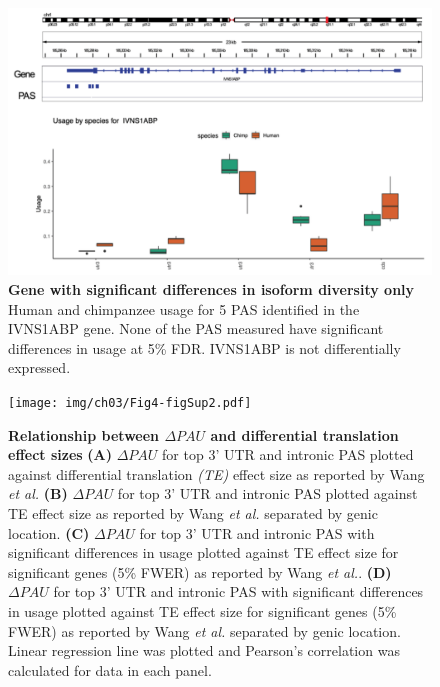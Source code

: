 \begin{figure}[!htb]
\centering
\includegraphics[width=5in]{img/ch03/Fig4_figSup1.pdf}
\caption[Gene with significant differences in isoform diversity only]{\textbf{Gene with significant differences in isoform diversity only} Human and chimpanzee usage for 5 PAS identified in the IVNS1ABP gene. None of the PAS measured have significant differences in usage at 5\% FDR. IVNS1ABP is not differentially expressed.}
\label{fig:ch03-ivn}
\end{figure}
\clearpage

\begin{figure}[!htb]
\centering
\texttt{[image: img/ch03/Fig4-figSup2.pdf]}
\caption[Relationship between $\Delta PAU$  and differential translation effect sizes]{\textbf{Relationship between $\Delta PAU$  and differential translation effect sizes} {\bf (A)} $\Delta PAU$ for top 3' UTR and intronic PAS plotted against differential translation \emph{(TE)} effect size as reported by Wang \emph{et al.}\citep{wang_post-translational_2018} {\bf (B)} $\Delta PAU$ for top 3' UTR and intronic PAS plotted against TE effect size as reported by Wang \emph{et al.} \citep{wang_post-translational_2018} separated by genic location.  {\bf (C)} $\Delta PAU$ for top 3' UTR and intronic PAS with significant differences in usage plotted against TE effect size for significant genes (5\% FWER) as reported by Wang \emph{et al.}\citep{wang_post-translational_2018}. {\bf (D)}  $\Delta PAU$ for top 3' UTR and intronic PAS with significant differences in usage plotted against TE effect size for significant genes (5\% FWER) as reported by Wang \emph{et al.}\citep{wang_post-translational_2018} separated by genic location. Linear regression line was plotted and Pearson's correlation was calculated for data in each panel.}
\label{fig:ch03-TEdAPA}
\end{figure}
\clearpage

